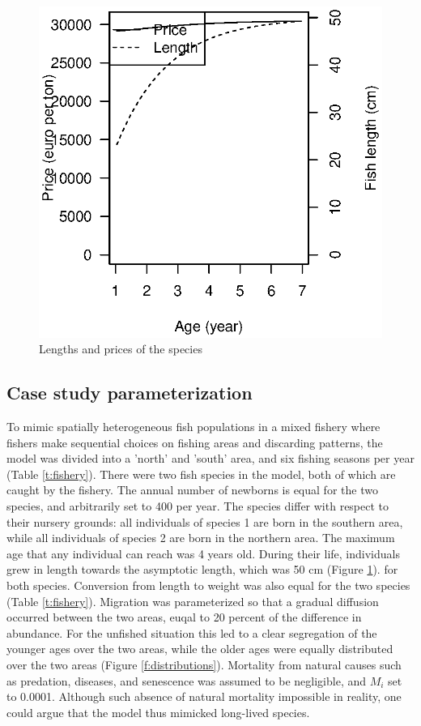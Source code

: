 \documentclass[12pt,oneline,a4paper,numbib]{ouparticle}
\numberwithin{equation}{subsection} %
\begin{document}
\begin{figure}[!ht]
\centering
\label{f:prices}
\includegraphics[width=.69\textwidth]{Figures/Prices.eps} 
\caption{Lengths and prices of the species}
\end{figure}


\subsection{Case study parameterization}

To mimic spatially heterogeneous fish populations in a mixed fishery where fishers make sequential choices on fishing areas and discarding patterns, the model was divided into a 'north' and 'south' area, and six fishing seasons per year (Table \ref{t:fishery}). There were two fish species in the model, both of which are caught by the fishery. The annual number of newborns is equal for the two species, and arbitrarily set to 400 per year. The species differ with respect to their nursery grounds: all individuals of species 1 are born in the southern area, while all individuals of species 2 are born in the northern area. The maximum age that any individual can reach was 4 years old. During their life, individuals grew in length towards the asymptotic length, which was 50 cm (Figure \ref{f:prices}). for both species. Conversion from length to weight was also equal for the two species (Table \ref{t:fishery}). Migration was parameterized so that a gradual diffusion occurred between the two areas, euqal to 20 percent of the difference in abundance. For the unfished situation this led to a clear segregation of the younger ages over the two areas, while the older ages were equally distributed over the two areas  (Figure \ref{f:distributions}). Mortality from natural causes such as predation, diseases, and senescence was assumed to be negligible, and $M_i$ set to 0.0001. Although such absence of natural mortality impossible in reality, one could argue that the model thus mimicked long-lived species.
  
\end{document}
